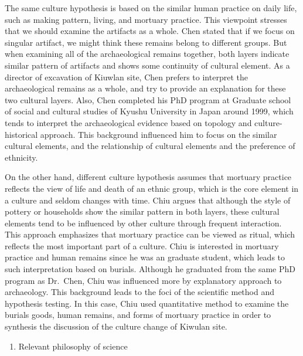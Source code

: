 \documentclass[10pt]{article}
\begin{document}
The same culture hypothesis is based on the similar human practice on
daily life, such as making pattern, living, and mortuary practice. This
viewpoint stresses that we should examine the artifacts as a whole. Chen
stated that if we focus on singular artifact, we might think these
remains belong to different groups. But when examining all of the
archaeological remains together, both layers indicate similar pattern of
artifacts and shows some continuity of cultural element. As a director
of excavation of Kiuwlan site, Chen prefers to interpret the
archaeological remains as a whole, and try to provide an explanation for
these two cultural layers. Also, Chen completed his PhD program at
Graduate school of social and cultural studies of Kyushu University in
Japan around 1999, which tends to interpret the archaeological evidence
based on topology and culture-historical approach. This background
influenced him to focus on the similar cultural elements, and the
relationship of cultural elements and the preference of ethnicity.

On the other hand, different culture hypothesis assumes that mortuary
practice reflects the view of life and death of an ethnic group, which
is the core element in a culture and seldom changes with time. Chiu
argues that although the style of pottery or households show the similar
pattern in both layers, these cultural elements tend to be influenced by
other culture through frequent interaction. This approach emphasizes
that mortuary practice can be viewed as ritual, which reflects the most
important part of a culture. Chiu is interested in mortuary practice and
human remains since he was an graduate student, which leads to such
interpretation based on burials. Although he graduated from the same PhD
program as Dr.~Chen, Chiu was influenced more by explanatory approach to
archaeology. This background leads to the foci of the scientific method
and hypothesis testing. In this case, Chiu used quantitative method to
examine the burials goods, human remains, and forms of mortuary practice
in order to synthesis the discussion of the culture change of Kiwulan
site.

\begin{enumerate}
\def\labelenumi{\arabic{enumi}.}
\setcounter{enumi}{1}
\itemsep1pt\parskip0pt
\item
  Relevant philosophy of science
\end{enumerate}
\end{document}
